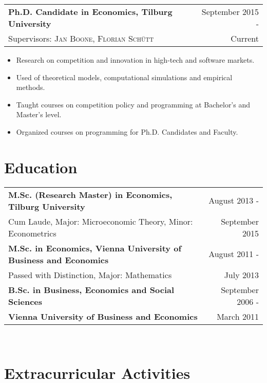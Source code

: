 \documentclass[a4paper,8pt]{article}
\begin{document}
\begin{tabular}{p{15cm} r}
	\textbf{Ph.D. Candidate in Economics, Tilburg University} &September 2015 -\\
	\small Supervisors:  \textsc{Jan Boone},  \textsc{Florian Schütt} & Current\phantom{ -}\\
\end{tabular}\vspace{-0.5em}
\begin{itemize}[noitemsep]
	\item Research on competition and innovation in high-tech and software markets.
	\item Used of theoretical models, computational simulations and empirical methods.
	\item Taught courses on competition policy and programming at Bachelor's and Master's level.
	\item Organized courses on programming for Ph.D. Candidates and Faculty.
\end{itemize}

\section{Education}

\begin{tabular}{p{15cm} r}
	\textbf{M.Sc. (Research Master) in Economics, Tilburg University}&  August 2013 -\\
	Cum Laude, Major: Microeconomic Theory, Minor: Econometrics& September 2015\hphantom{-}
	\vspace{0.5em}\\		
	\textbf{M.Sc. in Economics, Vienna University of Business and Economics}& August 2011 -\\
	Passed with Distinction, Major: Mathematics & July 2013\phantom{-}
	\vspace{0.5em}\\ 
	\textbf{B.Sc. in Business, Economics and Social Sciences}& September 2006 -\\ 
	\textbf{Vienna University of Business and Economics}& March 2011\phantom{- }\\
\end{tabular}\\

\section{Extracurricular Activities }
\end{document}
